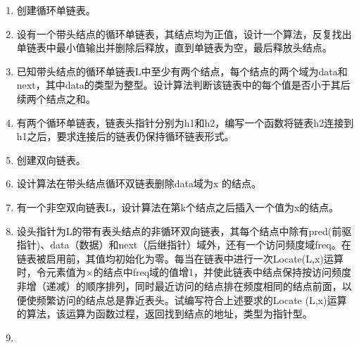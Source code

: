 \documentclass[lang=cn,newtx,10pt,scheme=chinese]{../../elegantbook}
\begin{document}
\begin{enumerate}
\def\labelenumi{\arabic{enumi}.}
\item
  
  创建循环单链表。
  
\vspace{5cm}
\item
  
  设有一个带头结点的循环单链表，其结点均为正值，设计一个算法，反复找出单链表中最小值输出并删除后释放，直到单链表为空，最后释放头结点。
  
\vspace{5cm}
\item
  
  已知带头结点的循环单链表L中至少有两个结点，每个结点的两个域为data和next，其中data的类型为整型。设计算法判断该链表中的每个值是否小于其后续两个结点之和。
  
\vspace{5cm}
\item
  
  有两个循环单链表，链表头指针分别为h1和h2，编写一个函数将链表h2连接到h1之后，要求连接后的链表仍保持循环链表形式。
  
\vspace{5cm}
\item
  
  创建双向链表。
  
\vspace{5cm}
\item
  
  设计算法在带头结点循环双链表删除data域为x 的结点。
  
\vspace{5cm}
\item
  
  有一个非空双向链表L，设计算法在第k个结点之后插入一个值为x的结点。
  
\vspace{5cm}
\item
  
  设头指针为L的带有表头结点的非循环双向链表，其每个结点中除有pred(前驱指针)、data（数据）和next（后继指针）域外，还有一个访问频度域freq。在链表被启用前，其值均初始化为零。每当在链表中进行一次Locate(L,x)运算时，令元素值为×的结点中freq域的值增1，并使此链表中结点保持按访问频度非增（递减）的顺序排列，同时最近访问的结点排在频度相同的结点前面，以便使频繁访问的结点总是靠近表头。试编写符合上述要求的Locate
  (L,x)运算的算法，该运算为函数过程，返回找到结点的地址，类型为指针型。
  
\vspace{5cm}
\item
  

\end{enumerate}
\end{document}
